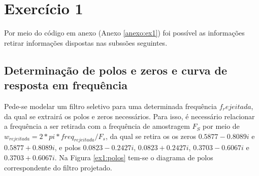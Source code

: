 \documentclass[a4paper,12pt,oneside,openany,table,xcdraw]{article}
\begin{document}
\newcommand{\thedepartment}{Faculdade de Engenharia Elétrica}
\newcommand{\thecourse}{FEELT}
\newcommand{\thetitle}{Resolução da Lista de Exercícios Extras}
\newcommand{\thetype}{Trabalho de Sinais e Sistemas II}
\newcommand{\theproftitle}{Bacharel em Engenharia Elétrica}
\newcommand{\thestudent}{Lesly Viviane Montúfar Berrios\\
\centering11811ETE001}
\newcommand{\theadvisor}{Prof. Alan Petrônio Pinheiro}
\newcommand{\thecity}{Uberlândia}

\thispagestyle{empty}



\onehalfspacing
\tableofcontents %
\newpage

\section{Exercício 1}
 Por meio do código em anexo (Anexo \ref{anexo:ex1}) foi possível as informações retirar informações dispostas nas subssões seguintes.
\vspace{0.3cm}

% 

\vspace{0.3cm}
\subsection{Determinação de polos e zeros e curva de resposta em frequência}
Pede-se modelar um filtro seletivo para uma determinada frequência $f_rejeitada$, da qual se extrairá os polos e zeros necessários. Para isso, é necessário relacionar a frequência a ser retirada com a frequência de amostragem $F_S$ por meio de $w_{rejeitada} = 2*pi*freq_{rejeitada}/F_s$, da qual se retira os os zeros $0.5877 - 0.8089i$ e $0.5877 + 0.8089i$, e polos $0.0823 - 0.2427i$,  $0.0823 + 0.2427i$,  $0.3703 - 0.6067i$ e $0.3703 + 0.6067i$. Na Figura \ref{ex1:polos} tem-se o diagrama de polos correspondente do filtro projetado.
\end{document}
